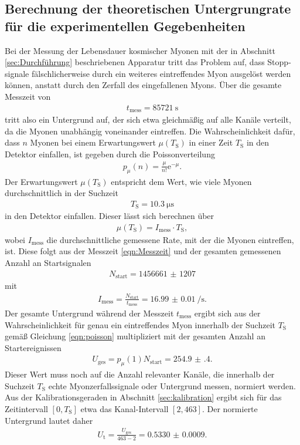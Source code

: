 \subsection{Berechnung der theoretischen Untergrungrate für die experimentellen Gegebenheiten}
\label{sec:untergrundtheo}

Bei der Messung der Lebensdauer kosmischer Myonen mit der in Abschnitt \ref{sec:Durchführung} beschriebenen Apparatur
tritt das Problem auf, dass Stopp-signale fälschlicherweise durch ein weiteres eintreffendes Myon ausgelöst werden können,
anstatt durch den Zerfall des eingefallenen Myons. Über die gesamte Messzeit von
\begin{align}
  t_\text{mess} = \SI{85721}{\second}
  \label{eqn:Messzeit}
\end{align}
tritt also ein Untergrund auf, der sich etwa gleichmäßig auf alle Kanäle verteilt, da die Myonen unabhängig voneinander eintreffen.
Die Wahrscheinlichkeit dafür, dass $n$ Myonen bei einem Erwartungswert $\mu(T_\text{S})$ in einer Zeit $T_\text{S}$ in den Detektor einfallen, ist gegeben durch die Poissonverteilung
\begin{align}
  p_\mu(n) = \frac{\mu}{n!} \mathrm{e}^{-\mu}.
\end{align}
Der Erwartungswert $\mu(T_\text{S})$ entspricht dem Wert, wie viele Myonen durchschnittlich in der Suchzeit
\begin{align}
  T_\text{S} = \SI{10.3}{\micro\second}
\end{align}
in den Detektor einfallen. Dieser lässt sich berechnen über
\begin{align}
  \mu(T_\text{S}) = I_\text{mess} \cdot T_\text{S},
  \label{eqn:poisson}
\end{align}
wobei $I_\text{mess}$ die durchschnittliche gemessene Rate, mit der die Myonen eintreffen, ist.
Diese folgt aus der Messzeit \eqref{eqn:Messzeit} und der gesamten gemessenen Anzahl an Startsignalen
\begin{align}
  N_\text{start} = \num{1456661(1207)}
\end{align}
mit
\begin{align}
  I_\text{mess} = \frac{N_\text{start}}{t_\text{mess}} = \SI{16.99(1)}{\per\second}.
\end{align}
Der gesamte Untergrund während der Messzeit $t_\text{mess}$ ergibt sich aus der Wahrscheinlichkeit für
genau ein eintreffendes Myon innerhalb der Suchzeit $T_\text{S}$ gemäß Gleichung \eqref{eqn:poisson} multipliziert mit der
gesamten Anzahl an Startereignissen
\begin{align}
  U_\text{ges} = p_\mu(1) N_\text{start} = \num{254.9(4)}.
\end{align}
Dieser Wert muss noch auf die Anzahl relevanter Kanäle, die innerhalb der Suchzeit $T_\text{S}$ echte Myonzerfallssignale
oder Untergrund messen, normiert werden. Aus der Kalibrationsgeraden in Abschnitt \ref{sec:kalibration} ergibt sich für das
Zeitintervall $[0,T_\text{S}]$ etwa das Kanal-Intervall $[2,463]$. Der normierte Untergrund lautet daher
\begin{align}
  U_\text{t} = \frac{U_\text{ges}}{463-2} = \num{0.5330(9)}.
  \label{eqn:Utheo}
\end{align}

